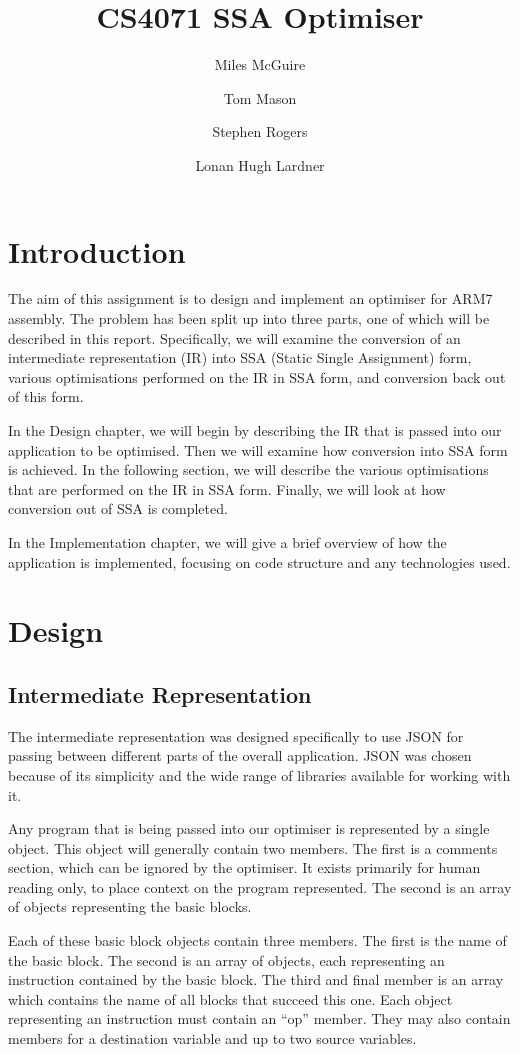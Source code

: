 \documentclass[a4paper,10pt]{report}
\title{CS4071 SSA Optimiser}
\author{
Miles McGuire\\
\and
Tom Mason\\
\and
Stephen Rogers\\
\and
Lonan Hugh Lardner
}
\begin{document}
\maketitle

\tableofcontents

\chapter{Introduction}
The aim of this assignment is to design and implement an optimiser for ARM7 assembly. The problem has been split up
into three parts, one of which will be described in this report. Specifically, we will examine the conversion of an
intermediate representation (IR) into SSA (Static Single Assignment) form, various optimisations performed on the IR 
in SSA form, and conversion back out of this form.

In the Design chapter, we will begin by describing the IR that is passed into our application to be optimised. Then we 
will examine how conversion into SSA form is achieved. In the following section, we will describe the various 
optimisations that are performed on the IR in SSA form. Finally, we will look at how conversion out of SSA is completed.

In the Implementation chapter, we will give a brief overview of how the application is implemented, focusing on code 
structure and any technologies used.

\chapter{Design}

\section{Intermediate Representation}
The intermediate representation was designed specifically to use JSON for passing between different parts of the overall 
application. JSON was chosen because of its simplicity and the wide range of libraries available for working with it.

Any program that is being passed into our optimiser is represented by a single object. This object will generally contain
two members. The first is a comments section, which can be ignored by the optimiser. It exists primarily for human reading 
only, to place context on the program represented. The second is an array of objects representing the basic blocks.

Each of these basic block objects contain three members. The first is the name of the basic block. The second is an array
of objects, each representing an instruction contained by the basic block. The third and final member is an array which
contains the name of all blocks that succeed this one. Each object representing an instruction must contain an ``op'' 
member. They may also contain members for a destination variable and up to two source variables.
\end{document}
